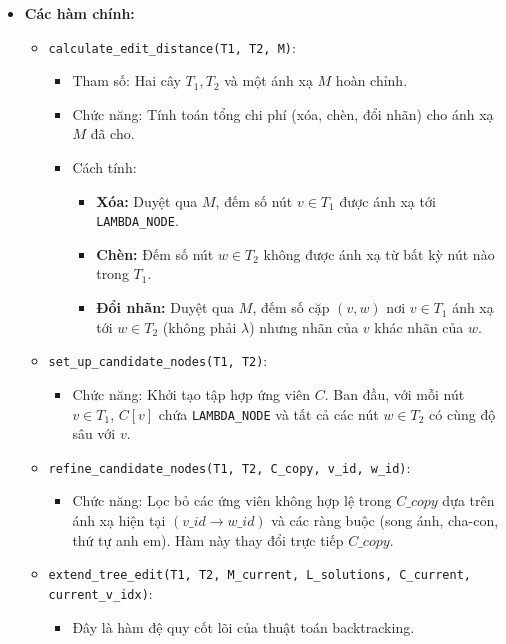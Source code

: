 \documentclass{article}
\begin{document}
\begin{itemize}
    \item \textbf{Các hàm chính:}
    \begin{itemize}
        \item \texttt{calculate\_edit\_distance(T1, T2, M)}:
            \begin{itemize}
                \item Tham số: Hai cây $T_1, T_2$ và một ánh xạ $M$ hoàn chỉnh.
                \item Chức năng: Tính toán tổng chi phí (xóa, chèn, đổi nhãn) cho ánh xạ $M$ đã cho.
                \item Cách tính:
                    \begin{itemize}
                        \item \textbf{Xóa:} Duyệt qua $M$, đếm số nút $v \in T_1$ được ánh xạ tới \texttt{LAMBDA\_NODE}.
                        \item \textbf{Chèn:} Đếm số nút $w \in T_2$ không được ánh xạ từ bất kỳ nút nào trong $T_1$.
                        \item \textbf{Đổi nhãn:} Duyệt qua $M$, đếm số cặp $(v, w)$ nơi $v \in T_1$ ánh xạ tới $w \in T_2$ (không phải $\lambda$) nhưng nhãn của $v$ khác nhãn của $w$.
                    \end{itemize}
            \end{itemize}
        \item \texttt{set\_up\_candidate\_nodes(T1, T2)}:
            \begin{itemize}
                \item Chức năng: Khởi tạo tập hợp ứng viên $C$. Ban đầu, với mỗi nút $v \in T_1$, $C[v]$ chứa \texttt{LAMBDA\_NODE} và tất cả các nút $w \in T_2$ có cùng độ sâu với $v$.
            \end{itemize}
        \item \texttt{refine\_candidate\_nodes(T1, T2, C\_copy, v\_id, w\_id)}:
            \begin{itemize}
                \item Chức năng: Lọc bỏ các ứng viên không hợp lệ trong $C\_copy$ dựa trên ánh xạ hiện tại $(v\_id \to w\_id)$ và các ràng buộc (song ánh, cha-con, thứ tự anh em). Hàm này thay đổi trực tiếp $C\_copy$.
            \end{itemize}
        \item \texttt{extend\_tree\_edit(T1, T2, M\_current, L\_solutions, C\_current, current\_v\_idx)}:
            \begin{itemize}
                \item Đây là hàm đệ quy cốt lõi của thuật toán backtracking.

\end{itemize}
\end{itemize}
\end{itemize}
\end{document}
